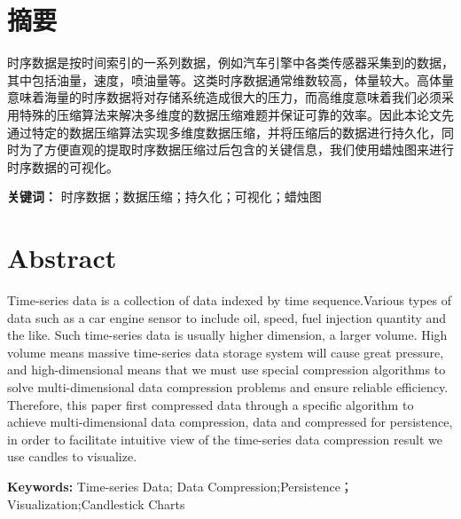 
\chapter*{摘要}
\label{Abstract CN}
时序数据是按时间索引的一系列数据，例如汽车引擎中各类传感器采集到的数据，其中包括油量，速度，喷油量等。这类时序数据通常维数较高，体量较大。高体量意味着海量的时序数据将对存储系统造成很大的压力，而高维度意味着我们必须采用特殊的压缩算法来解决多维度的数据压缩难题并保证可靠的效率。因此本论文先通过特定的数据压缩算法实现多维度数据压缩，并将压缩后的数据进行持久化，同时为了方便直观的提取时序数据压缩过后包含的关键信息，我们使用蜡烛图来进行时序数据的可视化。
\hfill\break

\textbf{关键词：} 时序数据；数据压缩；持久化；可视化；蜡烛图

\chapter*{Abstract}
\label{Abstract EN}

Time-series data is a collection of data indexed by time sequence.Various types of data such as a car engine sensor to include oil, speed, fuel injection quantity and the like. Such time-series data is usually higher dimension, a larger volume. High volume means massive time-series data storage system will cause great pressure, and high-dimensional means that we must use special compression algorithms to solve multi-dimensional data compression problems and ensure reliable efficiency. Therefore, this paper first compressed data through a specific algorithm to achieve multi-dimensional data compression, data and compressed for persistence, in order to facilitate intuitive view of the time-series data compression result we use candles to visualize.
\hfill\break

\textbf{Keywords:} Time-series Data; Data Compression;Persistence；Visualization;Candlestick Charts
